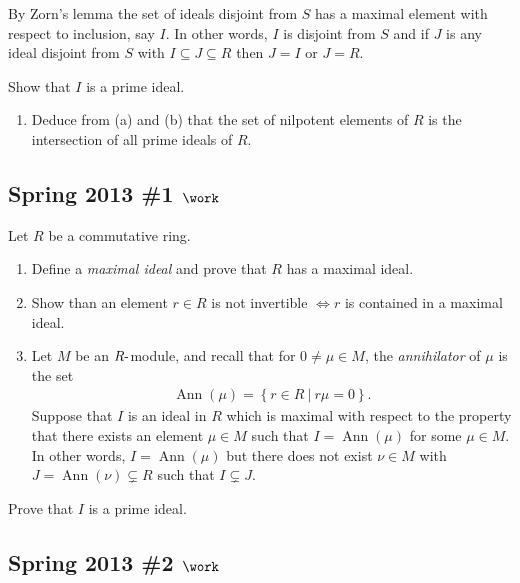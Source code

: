 By Zorn's lemma the set of ideals disjoint from \(S\) has a maximal
element with respect to inclusion, say \(I\). In other words, \(I\) is
disjoint from \(S\) and if \(J\) is any ideal disjoint from \(S\) with
\(I\subseteq J \subseteq R\) then \(J=I\) or \(J=R\).

Show that \(I\) is a prime ideal.

\begin{enumerate}
\def\labelenumi{\alph{enumi}.}
\setcounter{enumi}{3}
\tightlist
\item
  Deduce from (a) and (b) that the set of nilpotent elements of \(R\) is
  the intersection of all prime ideals of \(R\).
\end{enumerate}

\hypertarget{spring-2013-1-work}{%
\subsection{\texorpdfstring{Spring 2013 \#1
\(\work\)}{Spring 2013 \#1 \textbackslash work}}\label{spring-2013-1-work}}

Let \(R\) be a commutative ring.

\begin{enumerate}
\def\labelenumi{\alph{enumi}.}
\item
  Define a \emph{maximal ideal} and prove that \(R\) has a maximal
  ideal.
\item
  Show than an element \(r\in R\) is not invertible \(\iff r\) is
  contained in a maximal ideal.
\item
  Let \(M\) be an \(R{\hbox{-}}\)module, and recall that for
  \(0\neq \mu \in M\), the \emph{annihilator} of \(\mu\) is the set
  \begin{align*}
  \operatorname{Ann}(\mu) = \left\{{r\in R {~\mathrel{\Big|}~}r\mu = 0}\right\}
  .\end{align*}
  Suppose that \(I\) is an ideal in \(R\) which is maximal with respect
  to the property that there exists an element \(\mu \in M\) such that
  \(I = \operatorname{Ann}(\mu)\) for some \(\mu \in M\). In other
  words, \(I = \operatorname{Ann}(\mu)\) but there does not exist
  \(\nu\in M\) with \(J = \operatorname{Ann}(\nu) \subsetneq R\) such
  that \(I\subsetneq J\).
\end{enumerate}

Prove that \(I\) is a prime ideal.

\hypertarget{spring-2013-2-work}{%
\subsection{\texorpdfstring{Spring 2013 \#2
\(\work\)}{Spring 2013 \#2 \textbackslash work}}\label{spring-2013-2-work}}

